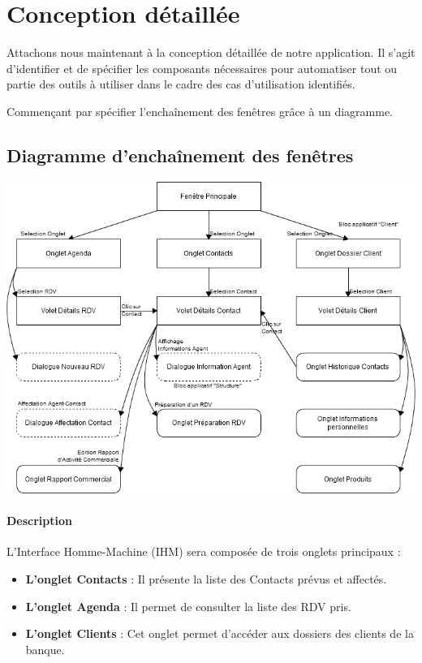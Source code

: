 
\section{Conception détaillée}

Attachons nous maintenant à la conception détaillée de notre application. Il s'agit
d'identifier et de spécifier les composants nécessaires pour automatiser tout ou
partie des outils à utiliser dans le cadre des cas d'utilisation identifiés.

Commençant par spécifier l'enchaînement des fenêtres grâce à un diagramme.

\subsection{Diagramme d'enchaînement des fenêtres}
\medskip
\begin {center}
\includegraphics[width=\textwidth]{diagramme-edf.png}
\end {center}
\medskip

\paragraph{Description}

L'Interface Homme-Machine (IHM) sera composée de trois onglets
principaux :

\begin{itemize}
\item \textbf{L'onglet Contacts} : Il présente la liste des Contacts prévus et affectés.
\item \textbf{L'onglet Agenda} : Il permet de consulter la liste des RDV pris.
\item \textbf{L'onglet Clients} : Cet onglet permet d'accéder aux dossiers des clients de la banque.
\end{itemize}

